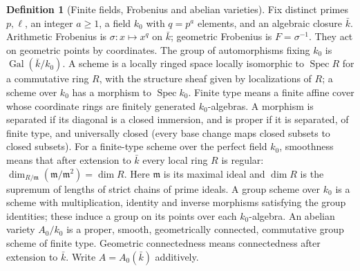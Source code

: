 \documentclass[11pt]{article}
\makeatletter
\theoremstyle{plain}
\theoremstyle{definition}
\newtheorem{definition}[theorem]{Definition}
\newcommand{\Fq}{\mathbf F_{r}}
\newcommand{\Pic}{\mathrm{Pic}}
\newcommand{\up}[1]{%
  \ifcsname r@#1\endcsname
    \hyperref[#1]{\texttt{\scriptsize #1}}%
  \else
    \texttt{\scriptsize #1}%
  \fi}
\newcommand{\uses}[1]{\par\smallskip\noindent{\footnotesize\textit{Uses:}\ #1\par}\smallskip}
\makeatother
\begin{document}
\begingroup
\setlength{\emergencystretch}{3em}
\newcommand{\GL}{\operatorname{GL}}
\newcommand{\Lie}{\operatorname{Lie}}
\newcommand{\End}{\operatorname{End}}
\newcommand{\rad}{\operatorname{rad}}
\newcommand{\dw}{\operatorname{dw}}
\newcommand{\Gal}{\operatorname{Gal}}
\newcommand{\Zell}{\mathbf Z_\ell}
\newcommand{\Qell}{\mathbf Q_\ell}
\renewcommand{\Pic}{\operatorname{Pic}}
\renewcommand{\Fq}{\mathbf F_q}
\renewcommand{\up}[1]{%
  \ifcsname r@#1\endcsname
    \hyperref[#1]{\textnormal{\scriptsize\nolinkurl{#1}}}%
  \else
    \textnormal{\scriptsize\nolinkurl{#1}}%
  \fi}
\let\aguses\uses
\renewcommand{\uses}[1]{{\raggedright\aguses{#1}}}
\ExplSyntaxOn
{}
\ExplSyntaxOff
\begin{definition}[Finite fields, Frobenius and abelian varieties]\label{d:ab-field}
Fix distinct primes $p,\ell$, an integer $a\ge1$, a field $k_0$ with
$q=p^a$ elements, and an algebraic closure $\bar k$.
Arithmetic Frobenius is $\sigma:x\mapsto x^q$ on $\bar k$; geometric
Frobenius is $F=\sigma^{-1}$. They act on geometric points by coordinates.
The group of automorphisms fixing $k_0$ is $\Gal(\bar k/k_0)$.
A scheme is a locally ringed space locally isomorphic to
$\operatorname{Spec}R$ for a commutative ring $R$, with the structure
sheaf given by localizations of $R$; a scheme over $k_0$ has a morphism
to $\operatorname{Spec}k_0$. Finite type means a finite affine cover
whose coordinate rings are finitely generated $k_0$-algebras.
A morphism is separated if its diagonal is a closed immersion, and is
proper if it is separated, of finite type, and universally closed
(every base change maps closed subsets to closed subsets).
For a finite-type scheme over the perfect field $k_0$, smoothness means
that after extension to $\bar k$ every local ring $R$ is regular:
$\dim_{R/\mathfrak m}(\mathfrak m/\mathfrak m^2)=\dim R$.
Here $\mathfrak m$ is its maximal ideal and $\dim R$ is the supremum
of lengths of strict chains of prime ideals.
A group scheme over $k_0$ is a scheme with multiplication, identity and
inverse morphisms satisfying the group identities; these induce a group
on its points over each $k_0$-algebra. An abelian variety $A_0/k_0$ is a
proper, smooth, geometrically connected, commutative group scheme of
finite type. Geometric connectedness means connectedness after extension
to $\bar k$. Write $A=A_0(\bar k)$ additively.
\end{definition}
\end{document}
